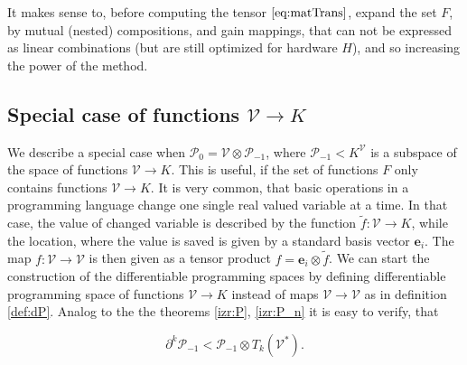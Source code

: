\documentclass[preprint,12pt]{elsarticle}
\newcommand{\VV}{\mathcal{V}}
\newcommand{\e}{\mathbf{e}}
\newcommand{\dP}{\mathcal{P}}
\newcommand{\D}{\partial}
\begin{document}
  It makes sense to, before computing the tensor $\eqref{eq:matTrans}$, expand the set $F$, by mutual (nested) compositions, and gain mappings, that can not be expressed as linear combinations (but are still optimized for hardware $H$), and so increasing the power of the method.
\subsection{Special case of functions $\VV\to K$}
We describe a special case when $\dP_0=\VV\otimes\dP_{-1}$, where
$\dP_{-1}<K^\VV$ is a subspace of the space of functions $\VV\to K$. This is
useful, if the set of functions $F$ only contains functions $\VV\to K$. It is
very common, that basic operations in a programming language change one single
real valued variable at a time. In that case, the value of changed variable is
described by the function $\tilde{f}:\VV\to K$, while the location, where the
value is saved is given by a standard basis vector $\e_i$. The map $f:\VV\to \VV$
is then given as a tensor product $f=\e_i\otimes \tilde{f}$. We can start the
construction of the differentiable programming spaces by defining differentiable
programming space of functions $\VV\to K$ instead of maps $\VV\to \VV$ as in
definition \ref{def:dP}.  Analog to the the theorems \ref{izr:P}, \ref{izr:P_n}
it is easy to verify, that

\begin{equation}
  \label{eq:tilda_dP}
  \D^k\dP_{-1} < \dP_{-1}\otimes T_k(\VV^*).
\end{equation}
\end{document}
